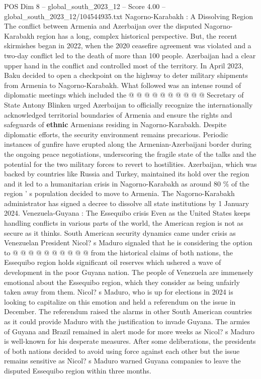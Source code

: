 \begin{textsample}{POS Dim 8 – global\_south\_2023\_12 – Score 4.00 – global\_south\_2023\_12/104544935.txt}
Nagorno-Karabakh : A Dissolving Region The conflict between Armenia and Azerbaijan over the disputed Nagorno-Karabakh region has a long, complex historical perspective.
But, the recent skirmishes began in 2022, when the 2020 ceasefire agreement was violated and a two-day conflict led to the death of more than 100 people.
Azerbaijan had a clear upper hand in the conflict and controlled most of the territory.
In April 2023, Baku decided to open a checkpoint on the highway to deter military shipments from Armenia to Nagorno-Karabakh.
What followed was an intense round of diplomatic meetings which included the @ @ @ @ @ @ @ @ @ @ Secretary of State Antony Blinken urged Azerbaijan to officially recognize the internationally acknowledged territorial boundaries of Armenia and ensure the rights and safeguards of \textbf{ethnic} Armenians residing in Nagorno-Karabakh.
Despite diplomatic efforts, the security environment remains precarious.
Periodic instances of gunfire have erupted along the Armenian-Azerbaijani border during the ongoing peace negotiations, underscoring the fragile state of the talks and the potential for the two military forces to revert to hostilities.
Azerbaijan, which was backed by countries like Russia and Turkey, maintained its hold over the region and it led to a humanitarian crisis in Nagorno-Karabakh as around 80 \% of the region ' s population decided to move to Armenia.
The Nagorno-Karabakh administrator has signed a decree to dissolve all state institutions by 1 January 2024.
Venezuela-Guyana : The Essequibo crisis Even as the United States keeps handling conflicts in various parts of the world, the American region is not as secure as it thinks.
South American security dynamics came under crisis as Venezuelan President Nicol? s Maduro signaled that he is considering the option to @ @ @ @ @ @ @ @ @ @ from the historical claims of both nations, the Essequibo region holds significant oil reserves which ushered a wave of development in the poor Guyana nation.
The people of Venezuela are immensely emotional about the Essequibo region, which they consider as being unfairly taken away from them.
Nicol? s Maduro, who is up for elections in 2024 is looking to capitalize on this emotion and held a referendum on the issue in December.
The referendum raised the alarms in other South American countries as it could provide Maduro with the justification to invade Guyana.
The armies of Guyana and Brazil remained in alert mode for more weeks as Nicol? s Maduro is well-known for his desperate measures.
After some deliberations, the presidents of both nations decided to avoid using force against each other but the issue remains sensitive as Nicol? s Maduro warned Guyana companies to leave the disputed Essequibo region within three months.

\end{textsample}
